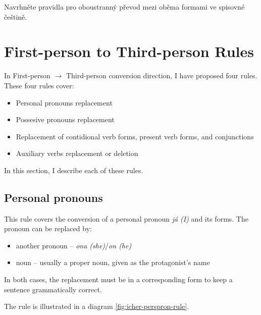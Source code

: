 Navrhněte pravidla pro oboustranný převod mezi oběma formami ve spisovné češtině.


\section{First-person to Third-person Rules}
In First-person $\rightarrow$ Third-person conversion direction, I have proposed four rules. These four rules cover:
	\begin{itemize}
		\item Personal pronouns replacement
		\item Possesive pronouns replacement
		\item Replacement of contidional verb forms, present verb forms, and conjunctions
		\item Auxiliary verbs replacement or deletion
	\end{itemize}

In this section, I describe each of these rules.

\subsection{Personal pronouns}

This rule covers the conversion of a personal pronoun \emph{já (I)} and its forms. The pronoun can be replaced by:
	\begin{itemize}
		\item another pronoun -- \emph{ona (she)}/\emph{on (he)}
		\item noun -- usually a proper noun, given as the protagonist's name
	\end{itemize}

In both cases, the replacement must be in a corresponding form to keep a sentence grammatically correct.

The rule is illustrated in a diagram \ref{fig:icher-perspron-rule}.

